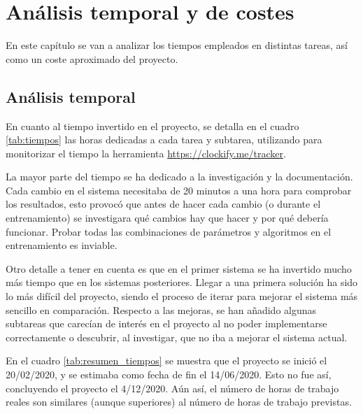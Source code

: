 \chapter{An\'alisis temporal y de costes}\label{anatemporal}

En este capítulo se van a analizar los tiempos empleados en distintas tareas, así como un coste aproximado del proyecto.

\section{Análisis temporal}

En cuanto al tiempo invertido en el proyecto, se detalla en el cuadro \ref{tab:tiempos} las horas dedicadas a cada tarea y subtarea, utilizando para monitorizar el tiempo la herramienta \url{https://clockify.me/tracker}.

La mayor parte del tiempo se ha dedicado a la investigación y la documentación. Cada cambio en el sistema necesitaba de 20 minutos a una hora para comprobar los resultados, esto provocó que antes de hacer cada cambio (o durante el entrenamiento) se investigara qué cambios hay que hacer y por qué debería funcionar. Probar todas las combinaciones de parámetros y algoritmos en el entrenamiento es inviable.

Otro detalle a tener en cuenta es que en el primer sistema se ha invertido mucho más tiempo que en los sistemas posteriores. Llegar a una primera solución ha sido lo más difícil del proyecto, siendo el proceso de iterar para mejorar el sistema más sencillo en comparación. Respecto a las mejoras, se han añadido algunas subtareas que carecían de interés en el proyecto al no poder implementarse correctamente o descubrir, al investigar, que no iba a mejorar el sistema actual.

En el cuadro \ref{tab:resumen_tiempos} se muestra que el proyecto se inició el 20/02/2020, y se estimaba como fecha de fin el 14/06/2020. Esto no fue así, concluyendo el proyecto el 4/12/2020. Aún así, el número de horas de trabajo reales son similares (aunque superiores) al número de horas de trabajo previstas. 

